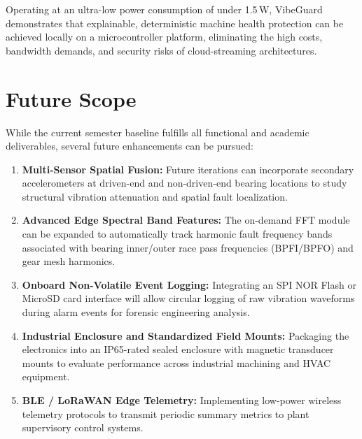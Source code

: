 \hspace{2em}Operating at an ultra-low power consumption of under 1.5\,W, VibeGuard demonstrates that explainable, deterministic machine health protection can be achieved locally on a microcontroller platform, eliminating the high costs, bandwidth demands, and security risks of cloud-streaming architectures.

\section{Future Scope}
\hspace{2em}While the current semester baseline fulfills all functional and academic deliverables, several future enhancements can be pursued:
\begin{enumerate}
    \item \textbf{Multi-Sensor Spatial Fusion:} Future iterations can incorporate secondary accelerometers at driven-end and non-driven-end bearing locations to study structural vibration attenuation and spatial fault localization.
    \item \textbf{Advanced Edge Spectral Band Features:} The on-demand FFT module can be expanded to automatically track harmonic fault frequency bands associated with bearing inner/outer race pass frequencies (BPFI/BPFO) and gear mesh harmonics.
    \item \textbf{Onboard Non-Volatile Event Logging:} Integrating an SPI NOR Flash or MicroSD card interface will allow circular logging of raw vibration waveforms during alarm events for forensic engineering analysis.
    \item \textbf{Industrial Enclosure and Standardized Field Mounts:} Packaging the electronics into an IP65-rated sealed enclosure with magnetic transducer mounts to evaluate performance across industrial machining and HVAC equipment.
    \item \textbf{BLE / LoRaWAN Edge Telemetry:} Implementing low-power wireless telemetry protocols to transmit periodic summary metrics to plant supervisory control systems.
\end{enumerate}
\clearpage
